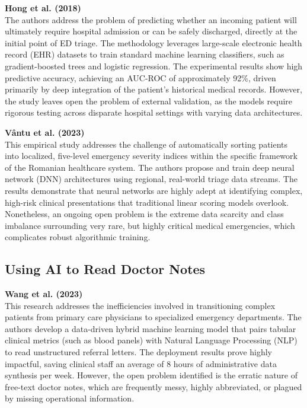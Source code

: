\documentclass{article}
\begin{document}
\noindent \textbf{Hong et al. (2018) \cite{Hong2018PredictingHA}} \\
The authors address the problem of predicting whether an incoming patient will ultimately require hospital admission or can be safely discharged, directly at the initial point of ED triage. The methodology leverages large-scale electronic health record (EHR) datasets to train standard machine learning classifiers, such as gradient-boosted trees and logistic regression. The experimental results show high predictive accuracy, achieving an AUC-ROC of approximately 92\%, driven primarily by deep integration of the patient's historical medical records. However, the study leaves open the problem of external validation, as the models require rigorous testing across disparate hospital settings with varying data architectures.

\vspace{0.3cm}
\noindent \textbf{Vântu et al. (2023) \cite{Vantu2023}} \\
This empirical study addresses the challenge of automatically sorting patients into localized, five-level emergency severity indices within the specific framework of the Romanian healthcare system. The authors propose and train deep neural network (DNN) architectures using regional, real-world triage data streams. The results demonstrate that neural networks are highly adept at identifying complex, high-risk clinical presentations that traditional linear scoring models overlook. Nonetheless, an ongoing open problem is the extreme data scarcity and class imbalance surrounding very rare, but highly critical medical emergencies, which complicates robust algorithmic training.

\subsection{Using AI to Read Doctor Notes}

\noindent \textbf{Wang et al. (2023) \cite{Wang2023}} \\
This research addresses the inefficiencies involved in transitioning complex patients from primary care physicians to specialized emergency departments. The authors develop a data-driven hybrid machine learning model that pairs tabular clinical metrics (such as blood panels) with Natural Language Processing (NLP) to read unstructured referral letters. The deployment results prove highly impactful, saving clinical staff an average of 8 hours of administrative data synthesis per week. However, the open problem identified is the erratic nature of free-text doctor notes, which are frequently messy, highly abbreviated, or plagued by missing operational information.
\end{document}
